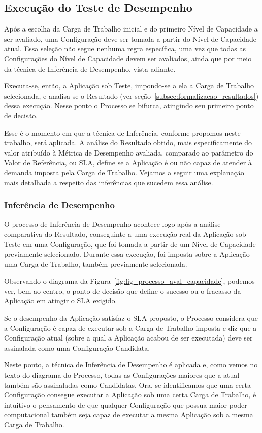 \subsection{Execução do Teste de Desempenho}
Após a escolha da Carga de Trabalho inicial e do primeiro Nível de Capacidade a
ser avaliado, uma Configuração deve ser tomada a partir do Nível de Capacidade 
atual. Essa seleção não segue nenhuma regra específica, uma vez que todas as 
Configurações do Nível de Capacidade devem ser avaliados, ainda que por meio da técnica de 
Inferência de Desempenho, vista adiante.
 
Executa-se, então, a Aplicação sob Teste, impondo-se a ela a Carga de Trabalho 
selecionada, e analisa-se o Resultado (ver seção~\ref{subsec:formalizacao_resultados}) 
dessa execução. Nesse ponto o Processo se bifurca, atingindo seu primeiro ponto 
de decisão.

Esse é o momento em que a técnica de Inferência, conforme propomos neste trabalho,
será aplicada. A análise do Resultado obtido, mais especificamente do valor atribuído
à Métrica de Desempenho avaliada, comparado ao parâmetro do Valor de Referência, 
ou SLA, define se a Aplicação é ou não capaz de atender à demanda imposta pela
Carga de Trabalho. Vejamos a seguir uma explanação mais detalhada a respeito das
inferências que sucedem essa análise.  

\subsubsection{Inferência de Desempenho}
O processo de Inferência de Desempenho acontece logo após a análise comparativa
do Resultado, conseguinte a uma execução real da Aplicação sob Teste em uma 
Configuração, que foi tomada a partir de um Nível de Capacidade previamente 
selecionado. Durante essa execução, foi imposta sobre a Aplicação uma Carga de 
Trabalho, também previamente selecionada.

Observando o diagrama da Figura~\ref{fig:fig_processo_aval_capacidade}, podemos 
ver, bem ao centro, o ponto de decisão que define o sucesso ou o fracasso da 
Aplicação em atingir o SLA exigido. 

Se o desempenho da Aplicação satisfaz o SLA proposto, o Processo considera que a
Configuração é capaz de executar sob a Carga de Trabalho imposta e diz que a 
Configuração atual (sobre a qual a Aplicação acabou de ser executada) deve ser
assinalada como uma Configuração Candidata.

Neste ponto, a técnica de Inferência de Desempenho é aplicada e, como vemos
no texto do diagrama do Processo, todas as Configurações maiores que a atual também
são assinaladas como Candidatas. Ora, se identificamos que uma certa Configuração
consegue executar a Aplicação sob uma certa Carga de Trabalho, é intuitivo o 
pensamento de que qualquer Configuração que possua maior poder computacional 
também seja capaz de executar a mesma Aplicação sob a mesma Carga de Trabalho.

